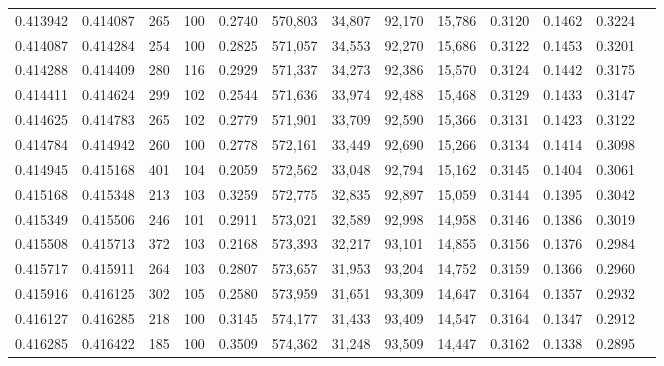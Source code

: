 \begin{tabular}{rrrrrrrrrrrrr}
0.413942 & 0.414087 &   265 & 100 &                                     0.2740 & 570,803 &  34,807 &  92,170 &  15,786 & 0.3120 & 0.1462 & 0.3224 \\
0.414087 & 0.414284 &   254 & 100 &                                     0.2825 & 571,057 &  34,553 &  92,270 &  15,686 & 0.3122 & 0.1453 & 0.3201 \\
0.414288 & 0.414409 &   280 & 116 &                                     0.2929 & 571,337 &  34,273 &  92,386 &  15,570 & 0.3124 & 0.1442 & 0.3175 \\
0.414411 & 0.414624 &   299 & 102 &                                     0.2544 & 571,636 &  33,974 &  92,488 &  15,468 & 0.3129 & 0.1433 & 0.3147 \\
0.414625 & 0.414783 &   265 & 102 &                                     0.2779 & 571,901 &  33,709 &  92,590 &  15,366 & 0.3131 & 0.1423 & 0.3122 \\
0.414784 & 0.414942 &   260 & 100 &                                     0.2778 & 572,161 &  33,449 &  92,690 &  15,266 & 0.3134 & 0.1414 & 0.3098 \\
0.414945 & 0.415168 &   401 & 104 &                                     0.2059 & 572,562 &  33,048 &  92,794 &  15,162 & 0.3145 & 0.1404 & 0.3061 \\
0.415168 & 0.415348 &   213 & 103 &                                     0.3259 & 572,775 &  32,835 &  92,897 &  15,059 & 0.3144 & 0.1395 & 0.3042 \\
0.415349 & 0.415506 &   246 & 101 &                                     0.2911 & 573,021 &  32,589 &  92,998 &  14,958 & 0.3146 & 0.1386 & 0.3019 \\
0.415508 & 0.415713 &   372 & 103 &                                     0.2168 & 573,393 &  32,217 &  93,101 &  14,855 & 0.3156 & 0.1376 & 0.2984 \\
0.415717 & 0.415911 &   264 & 103 &                                     0.2807 & 573,657 &  31,953 &  93,204 &  14,752 & 0.3159 & 0.1366 & 0.2960 \\
0.415916 & 0.416125 &   302 & 105 &                                     0.2580 & 573,959 &  31,651 &  93,309 &  14,647 & 0.3164 & 0.1357 & 0.2932 \\
0.416127 & 0.416285 &   218 & 100 &                                     0.3145 & 574,177 &  31,433 &  93,409 &  14,547 & 0.3164 & 0.1347 & 0.2912 \\
0.416285 & 0.416422 &   185 & 100 &                                     0.3509 & 574,362 &  31,248 &  93,509 &  14,447 & 0.3162 & 0.1338 & 0.2895 \\

\end{tabular}
